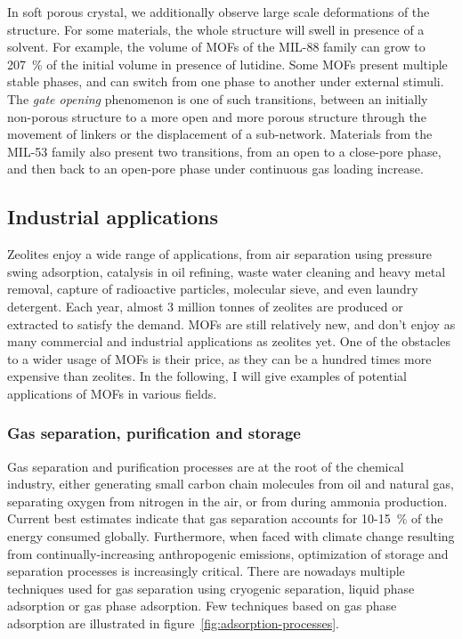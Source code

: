 \documentclass[thesis]{subfiles}
\begin{document}
In soft porous crystal, we additionally observe large scale deformations of the
structure. For some materials, the whole structure will swell in presence of a
solvent. For example, the volume of MOFs of the MIL-88 family can grow to 207~\%
of the initial volume in presence of lutidine\cite{Serre2007}. Some MOFs present
multiple stable phases, and can switch from one phase to another under external
stimuli. The \emph{gate opening} phenomenon is one of such transitions, between
an initially non-porous structure to a more open and more porous structure
through the movement of linkers or the displacement of a sub-network. Materials
from the MIL-53 family also present two transitions, from an open to a
close-pore phase, and then back to an open-pore phase\cite{Serre2002} under
continuous gas loading increase.

\subsection{Industrial applications}

Zeolites enjoy a wide range of applications, from air separation using pressure
swing adsorption\cite{Rege1997}, catalysis in oil refining\cite{Primo2014},
waste water cleaning and heavy metal removal\cite{Curkovi1997}, capture of
radioactive particles\cite{Borai2009}, molecular sieve\cite{Flanigen1978}, and
even laundry detergent\cite{Karge1989}. Each year, almost 3 million tonnes of
zeolites are produced or extracted to satisfy the demand. MOFs are still
relatively new, and don't enjoy as many commercial and industrial applications
as zeolites yet. One of the obstacles to a wider usage of MOFs is their price,
as they can be a hundred times more expensive than zeolites. In the following, I
will give examples of potential applications of MOFs in various fields.

\subsubsection{Gas separation, purification and storage}

Gas separation and purification processes are at the root of the chemical
industry, either generating small carbon chain molecules from oil and natural
gas, separating oxygen from nitrogen in the air, or  from  during
ammonia production. Current best estimates indicate that gas separation accounts
for 10-15~\% of the energy consumed globally\cite{Sholl2016}. Furthermore, when
faced with climate change resulting from continually-increasing anthropogenic
 emissions, optimization of storage and separation processes is
increasingly critical. There are nowadays multiple techniques used for gas
separation using cryogenic separation, liquid phase adsorption or gas phase
adsorption. Few techniques based on gas phase adsorption are illustrated in
figure~\ref{fig:adsorption-processes}.
\end{document}
